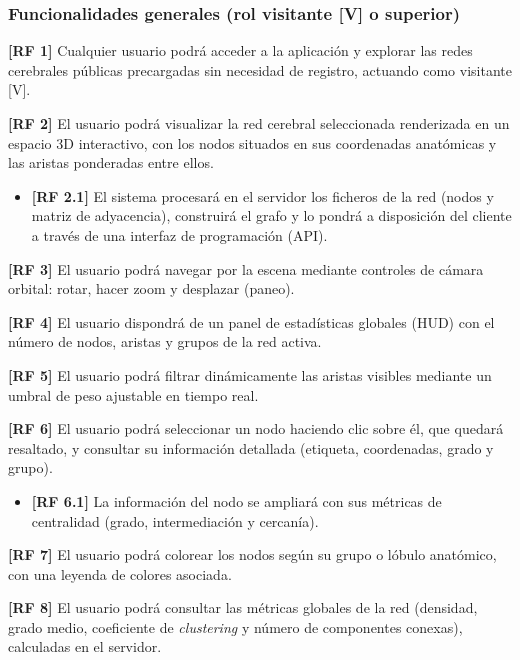\subsubsection*{Funcionalidades generales (rol visitante [V] o superior)}

\noindent\textbf{[RF 1]} Cualquier usuario podrá acceder a la aplicación y explorar las redes
cerebrales públicas precargadas sin necesidad de registro, actuando como visitante [V].

\noindent\textbf{[RF 2]} El usuario podrá visualizar la red cerebral seleccionada renderizada en un
espacio 3D interactivo, con los nodos situados en sus coordenadas anatómicas y las aristas ponderadas
entre ellos.
\begin{itemize}
	\item \textbf{[RF 2.1]} El sistema procesará en el servidor los ficheros de la red (nodos y matriz
		de adyacencia), construirá el grafo y lo pondrá a disposición del cliente a través de una
		interfaz de programación (API).
\end{itemize}

\noindent\textbf{[RF 3]} El usuario podrá navegar por la escena mediante controles de cámara orbital:
rotar, hacer zoom y desplazar (paneo).

\noindent\textbf{[RF 4]} El usuario dispondrá de un panel de estadísticas globales (HUD) con el
número de nodos, aristas y grupos de la red activa.

\noindent\textbf{[RF 5]} El usuario podrá filtrar dinámicamente las aristas visibles mediante un
umbral de peso ajustable en tiempo real.

\noindent\textbf{[RF 6]} El usuario podrá seleccionar un nodo haciendo clic sobre él, que quedará
resaltado, y consultar su información detallada (etiqueta, coordenadas, grado y grupo).
\begin{itemize}
	\item \textbf{[RF 6.1]} La información del nodo se ampliará con sus métricas de centralidad
		(grado, intermediación y cercanía).
\end{itemize}

\noindent\textbf{[RF 7]} El usuario podrá colorear los nodos según su grupo o lóbulo anatómico, con
una leyenda de colores asociada.

\noindent\textbf{[RF 8]} El usuario podrá consultar las métricas globales de la red (densidad, grado
medio, coeficiente de \textit{clustering} y número de componentes conexas), calculadas en el
servidor.

